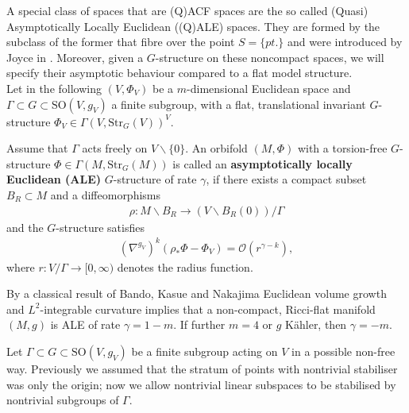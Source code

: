 \documentclass[psamsfonts]{amsart}
\theoremstyle{plain}
\theoremstyle{definition}{
\newtheorem{defi}{Definition}[section]
\newtheorem{ass}{Assumption}
\newtheorem*{nota}{Notation}}
\theoremstyle{remark}{
\newtheorem{rem}{Remark}
\newtheorem{ex}{Example}}
\theoremstyle{plain}{
\newtheorem{thm}{Theorem}[section]
\newtheorem{lem}{Lemma}[section]
\newtheorem{cor}{Corollary}[section]
\newtheorem{prop}{Proposition}[section]
\newtheorem{con}{Conjecture}[section]}
\newcommand{\m}[1]{{\mathrm{#1}}}
\begin{document}
A special class of spaces that are (Q)ACF spaces are the so called (Quasi) Asymptotically Locally Euclidean ((Q)ALE) spaces. They are formed by the subclass of the former that fibre over the point $S=\{pt.\}$ and were introduced by Joyce in \cite[Chap. 8 and 9]{joyce2000compact}. Moreover, given a $G$-structure on these noncompact spaces, we will specify their asymptotic behaviour compared to a flat model structure.\\ 



Let in the following $(V,\Phi_V)$ be a $m$-dimensional Euclidean space and $\Gamma\subset G\subset \m{SO}(V,g_V)$ a finite subgroup, with a flat, translational invariant $G$-structure $\Phi_V\in \Gamma(V,\m{Str}_G(V))^V$.


\begin{defi}
Assume that $\Gamma$ acts freely on $V\backslash \{0\}$. An orbifold $(M,\Phi)$ with a torsion-free $G$-structure $\Phi\in\Gamma(M,\m{Str}_G(M))$ is called an \textbf{asymptotically locally Euclidean (ALE)} $G$-structure of rate $\gamma$, if there exists a compact subset $B_R\subset M$ and a diffeomorphisms 
\begin{align*}
    \rho\colon M\backslash B_R\rightarrow (V\backslash B_R(0))/\Gamma
\end{align*}
and the $G$-structure satisfies
\begin{align*}
    (\nabla^{g_{V}})^k\left(\rho_*\Phi-\Phi_{V}\right)=\mathcal{O}(r^{\gamma-k}),
\end{align*}
where $r\colon V/\Gamma\rightarrow [0,\infty)$ denotes the radius function.
\end{defi}

\begin{rem}
By a classical result of Bando, Kasue and Nakajima \cite{bando1989construction} Euclidean volume growth and $L^2$-integrable curvature implies that a non-compact, Ricci-flat manifold $(M,g)$ is ALE of rate $\gamma=1-m$. If further $m=4$ or $g$ Kähler, then $\gamma=-m$.
\end{rem}



Let $\Gamma\subset G\subset \m{SO}(V,g_V)$ be a finite subgroup acting on $V$ in a possible non-free way. Previously we assumed that the stratum of points with nontrivial stabiliser was only the origin; now we allow nontrivial linear subspaces to be stabilised by nontrivial subgroups of $\Gamma$.\\
\end{document}
